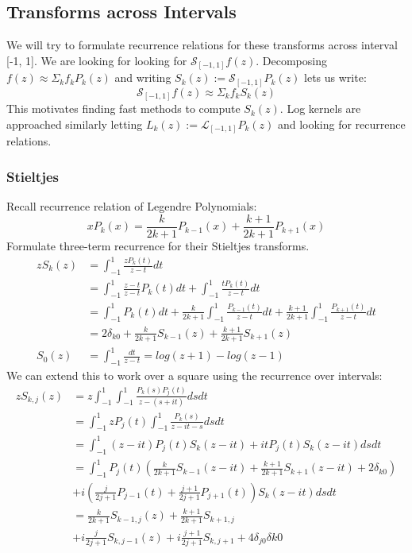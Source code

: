 \documentclass{article}
\begin{document}
\subsection{Transforms across Intervals}
We will try to formulate recurrence relations for these transforms across interval [-1, 1].
We are looking for looking for $\mathcal{S}_{[-1,1]}f(z)$.
Decomposing $f(z) \approx \Sigma_k f_kP_k(z)$ and writing $S_k(z):=\mathcal{S}_{[-1,1]}P_k(z)$ lets us write:
$$\mathcal{S}_{[-1,1]}f(z) \approx \Sigma_k f_kS_k(z)$$
This motivates finding fast methods to compute $S_k(z)$. Log kernels are approached similarly letting $L_k(z):=\mathcal{L}_{[-1,1]}P_k(z)$ and looking for recurrence relations.
\subsubsection*{Stieltjes}
Recall recurrence relation of Legendre Polynomials:
\begin{equation}\label{legendre recurrence}
	xP_k(x) = \frac{k}{2k+1}P_{k-1}(x) + \frac{k+1}{2k+1}P_{k+1}(x)
\end{equation}
Formulate three-term recurrence for their Stieltjes transforms.
\begin{equation}
\begin{split}
	zS_k(z) &= \int_{-1}^{1}\frac{zP_k(t)}{z-t}dt \\
	&= \int_{-1}^{1}\frac{z-t}{z-t}P_k(t)dt+\int_{-1}^{1}\frac{tP_k(t)}{z-t}dt \\
	&= \int_{-1}^{1}P_k(t)dt+\frac{k}{2k+1}\int_{-1}^{1}\frac{P_{k-1}(t)}{z-t}dt+\frac{k+1}{2k+1}\int_{-1}^{1}\frac{P_{k+1}(t)}{z-t}dt \\
	&= 2\delta_{k0}+\frac{k}{2k+1}S_{k-1}(z)+\frac{k+1}{2k+1}S_{k+1}(z) \\
	S_0(z) &= \int_{-1}^{1}\frac{dt}{z-t} = log(z+1)-log(z-1)
\end{split}
\end{equation}
We can extend this to work over a square using the recurrence over intervals:
\begin{equation}
\begin{split}
zS_{k,j}(z) &= z\int_{-1}^1\int_{-1}^1\frac{P_k(s)P_j(t)}{z-(s+it)}dsdt \\
&= \int_{-1}^1zP_j(t)\int_{-1}^1\frac{P_k(s)}{z-it-s}dsdt \\
&= \int_{-1}^1(z-it)P_j(t)S_k(z-it)+itP_j(t)S_k(z-it)dsdt \\
&= \int_{-1}^1P_j(t)(\frac{k}{2k+1}S_{k-1}(z-it)+\frac{k+1}{2k+1}S_{k+1}(z-it)+2\delta_{k0}) \\
&+i(\frac{j}{2j+1}P_{j-1}(t)+\frac{j+1}{2j+1}P_{j+1}(t))S_k(z-it)dsdt \\
&= \frac{k}{2k+1}S_{k-1,j}(z)+\frac{k+1}{2k+1}S_{k+1,j} \\
&+i\frac{j}{2j+1}S_{k,j-1}(z)+i\frac{j+1}{2j+1}S_{k,j+1}+4\delta_{j0}\delta{k0}
\end{split}
\end{equation}
\end{document}
